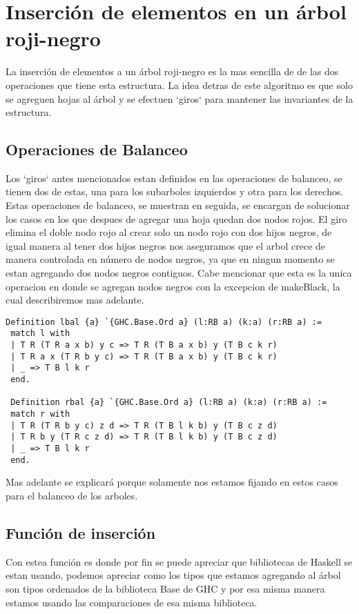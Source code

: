 \documentclass[letterpaper,12pt,oneside]{book}
\newcommand{\arn}{árbol roji-negro }
\begin{document}
\section{Inserción de elementos en un \arn}

La inserci\'on de elementos a un \arn es la mas sencilla de de las dos operaciones que tiene esta estructura. La idea detras de este algoritmo es que 
solo se agreguen hojas al \'arbol y se efectuen `giros` para mantener las invariantes de la estructura.
\subsection{Operaciones de Balanceo}
Los `giros` antes mencionados estan definidos en las operaciones de balanceo, se tienen dos de estas, una para los subarboles izquierdos y otra para los 
derechos. Estas operaciones de balanceo, se muestran en seguida, se encargan de solucionar los casos en los que despues de agregar una hoja quedan dos nodos rojos.
El giro elimina el doble nodo rojo al crear solo un nodo rojo con dos hijos negros, de igual manera al tener dos hijos negros nos aseguramos que el arbol crece de manera controlada 
en n\'umero de nodos negros, ya que en ningun momento se estan agregando dos nodos negros contiguos. Cabe mencionar que esta es la unica operacion en donde se agregan nodos negros con la excepcion de makeBlack, la cual describiremos mas adelante.
\begin{verbatim}
Definition lbal {a} `{GHC.Base.Ord a} (l:RB a) (k:a) (r:RB a) :=
 match l with
 | T R (T R a x b) y c => T R (T B a x b) y (T B c k r)
 | T R a x (T R b y c) => T R (T B a x b) y (T B c k r)
 | _ => T B l k r
 end.

 Definition rbal {a} `{GHC.Base.Ord a} (l:RB a) (k:a) (r:RB a) :=
 match r with
 | T R (T R b y c) z d => T R (T B l k b) y (T B c z d)
 | T R b y (T R c z d) => T R (T B l k b) y (T B c z d)
 | _ => T B l k r
 end.
\end{verbatim}

Mas adelante se explicar\'a porque solamente nos estamos fijando en estos casos para el balanceo de los arboles.
\subsection {Funci\'on de inserci\'on}
Con estea funci\'on es donde por fin se puede apreciar que bibliotecas de Haskell se estan usando, podemos apreciar como los tipos que estamos
agregando al \'arbol son tipos ordenados de la biblioteca Base de GHC y por esa misma manera estamos usando las comparaciones de esa misma biblioteca.
\end{document}
